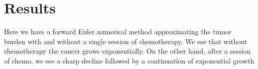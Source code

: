 \documentclass[11pt]{amsart}
\begin{document}
\section{Results}

Here we have a forward Euler numerical method approximating the tumor burden with and without a single session of chemotherapy. 
We see that without chemotherapy the cancer grows exponentially. 
On the other hand, after a session of chemo, 
we see a sharp decline followed by a continuation of exponential growth

\end{document}

